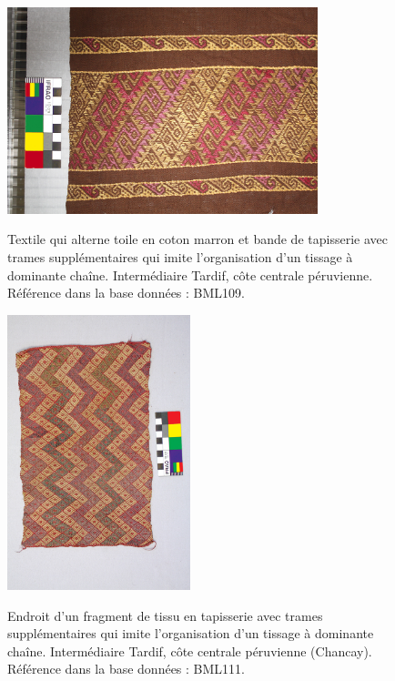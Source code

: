 \documentclass[a4paper, twoside]{book}
\begin{document}
\begin{figure}[!h]
    \begin{minipage}[c]{.5\linewidth}
     \begin{center}
        		\includegraphics[height=6cm, angle=-90]{../images/BML109.jpg}
	\end{center}
	\label{fig:BML109}  
	\caption{Textile qui alterne toile en coton marron et bande de tapisserie avec trames supplémentaires qui imite l'organisation d'un tissage à dominante chaîne. Intermédiaire Tardif, côte centrale péruvienne. \\ Référence dans la base données : BML109.}
    \end{minipage}
    \hspace{5pt}
    \begin{minipage}[c]{.5\linewidth}
         \begin{center}
                \includegraphics[height=8cm]{../images/BML111.jpg}
            \end{center}
             \label{fig:BML111}  
             \caption{Endroit d'un fragment de tissu en tapisserie avec trames supplémentaires qui imite l'organisation d'un tissage à dominante chaîne. Intermédiaire Tardif, côte centrale péruvienne (Chancay).\\ Référence dans la base données : BML111.}
    \end{minipage}
\end{figure}
\end{document}

